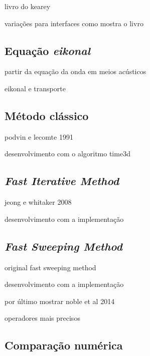 livro do kearey 

variações para interfaces como mostra o livro

\subsection*{Equação \textit{eikonal}}

partir da equação da onda em meios acústicos

eikonal e transporte

\subsection*{Método clássico}

podvin e lecomte 1991 

desenvolvimento com o algoritmo time3d

\subsection*{\textit{Fast Iterative Method}}

jeong e whitaker 2008

desenvolvimento com a implementação 

\subsection*{\textit{Fast Sweeping Method}}

original fast sweeping method

desenvolvimento com a implementação

por último mostrar noble et al 2014

operadores mais precisos



\subsection*{Comparação numérica}


